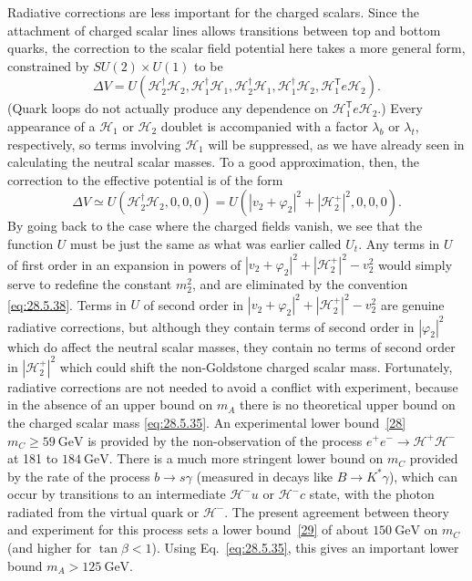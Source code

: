 Radiative corrections are less important for the charged scalars. Since the
attachment of charged scalar lines allows transitions between top and
bottom quarks, the correction to the scalar field potential here takes a
more general form, constrained by \(SU(2)\times U(1)\) to be
\begin{equation}
  \Delta V
  =U\left(
    \mathcal{H}_2^\dagger\mathcal{H}_2,
    \mathcal{H}_1^\dagger\mathcal{H}_1,
    \mathcal{H}_2^\dagger\mathcal{H}_1,
    \mathcal{H}_1^\dagger\mathcal{H}_2,
    \mathcal{H}_1^{\mathsf T}e\mathcal{H}_2
  \right).
  \tag{28.5.48}\label{eq:28.5.48}
\end{equation}
(Quark loops do not actually produce any dependence on
\(\mathcal{H}_1^{\mathsf T}e\mathcal{H}_2\).) Every appearance of a
\(\mathcal{H}_1\) or \(\mathcal{H}_2\) doublet is accompanied with a factor
\(\lambda_b\) or \(\lambda_t\), respectively, so terms involving
\(\mathcal{H}_1\) will be suppressed, as we have already seen in
calculating the neutral scalar masses. To a good approximation, then, the
correction to the effective potential is of the form
\begin{equation}
  \Delta V
  \simeq U(\mathcal{H}_2^\dagger\mathcal{H}_2,0,0,0)
  =U(|v_2+\varphi_2|^2+|\mathcal{H}_2^+|^2,0,0,0).
  \tag{28.5.49}\label{eq:28.5.49}
\end{equation}
By going back to the case where the charged fields vanish, we see that the
function \(U\) must be just the same as what was earlier called \(U_t\).
Any terms in \(U\) of first order in an expansion in powers of
\(|v_2+\varphi_2|^2+|\mathcal{H}_2^+|^2-v_2^2\) would simply serve to
redefine the constant \(m_2^2\), and are eliminated by the convention
\eqref{eq:28.5.38}. Terms in \(U\) of second order in
\(|v_2+\varphi_2|^2+|\mathcal{H}_2^+|^2-v_2^2\) are genuine radiative
corrections, but although they contain terms of second order in
\(|\varphi_2|^2\) which do affect the neutral scalar masses, they contain
no terms of second order in \(|\mathcal{H}_2^+|^2\) which could shift the
non-Goldstone charged scalar mass. Fortunately, radiative corrections are
not needed to avoid a conflict with experiment, because in the absence of
an upper bound on \(m_A\) there is no theoretical upper bound on the
charged scalar mass \eqref{eq:28.5.35}. An experimental lower
bound~\hyperref[ch28-ref-28]{[28]} \(m_C\geq59\ \mathrm{GeV}\) is provided
by the non-observation of the process
\(e^+e^-\longrightarrow\mathcal{H}^+\mathcal{H}^-\) at 181 to
\(184\ \mathrm{GeV}\). There is a much more stringent lower bound on
\(m_C\) provided by the rate of the process \(b\longrightarrow s\gamma\)
(measured in decays like \(B\longrightarrow K^*\gamma\)), which can occur
by transitions to an intermediate \(\mathcal{H}^-u\) or
\(\mathcal{H}^-c\) state, with the photon radiated from the virtual quark
or \(\mathcal{H}^-\). The present agreement between theory and experiment
for this process sets a lower bound~\hyperref[ch28-ref-29]{[29]} of about
\(150\ \mathrm{GeV}\) on \(m_C\) (and higher for \(\tan\beta<1\)). Using
Eq.~\eqref{eq:28.5.35}, this gives an important lower bound
\(m_A>125\ \mathrm{GeV}\).

